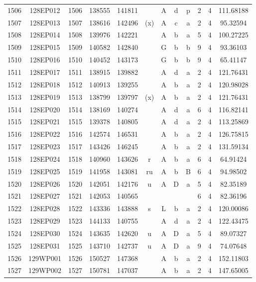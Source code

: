 \begin{tabular}{|*{12}{c|}}
1506 & 128EP012 & 1506 & 138555 & 141811 &  & A & d & p & 2 & 4 & 111.68188 \\ 
1507 & 128EP013 & 1507 & 138616 & 142496 & (x) & A & c & a & 2 & 4 & 95.32594 \\ 
1508 & 128EP014 & 1508 & 139976 & 142221 &  & A & b & a & 5 & 4 & 100.27225 \\ 
1509 & 128EP015 & 1509 & 140582 & 142840 &  & G & b & b & 9 & 4 & 93.36103 \\ 
1510 & 128EP016 & 1510 & 140452 & 143173 &  & G & b & b & 9 & 4 & 65.41147 \\ 
1511 & 128EP017 & 1511 & 138915 & 139882 &  & A & d & a & 2 & 4 & 121.76431 \\ 
1512 & 128EP018 & 1512 & 140913 & 139255 &  & A & b & a & 2 & 4 & 120.98028 \\ 
1513 & 128EP019 & 1513 & 138799 & 139797 & (x) & A & b & a & 2 & 4 & 121.76431 \\ 
1514 & 128EP020 & 1514 & 138169 & 140274 &  & A & d & a & 6 & 4 & 116.82141 \\ 
1515 & 128EP021 & 1515 & 139378 & 140805 &  & A & d & a & 2 & 4 & 113.25869 \\ 
1516 & 128EP022 & 1516 & 142574 & 146531 &  & A & b & a & 2 & 4 & 126.75815 \\ 
1517 & 128EP023 & 1517 & 143426 & 146245 &  & A & b & a & 2 & 4 & 131.59134 \\ 
1518 & 128EP024 & 1518 & 140960 & 143626 & r & A & b & a & 6 & 4 & 64.91424 \\ 
1519 & 128EP025 & 1519 & 141958 & 143081 & ru & A & b & B & 6 & 4 & 94.98502 \\ 
1520 & 128EP026 & 1520 & 142051 & 142176 & u & A & D & a & 5 & 4 & 82.35189 \\ 
1521 & 128EP027 & 1521 & 142053 & 140565 &  &  &  &  & 6 & 4 & 82.36196 \\ 
1522 & 128EP028 & 1522 & 143336 & 143888 & s & L & b & a & 2 & 4 & 120.00086 \\ 
1523 & 128EP029 & 1523 & 144133 & 140755 &  & A & d & a & 2 & 4 & 122.43475 \\ 
1524 & 128EP030 & 1524 & 143635 & 142620 & u & A & D & a & 5 & 4 & 89.07327 \\ 
1525 & 128EP031 & 1525 & 143710 & 142737 & u & A & D & a & 9 & 4 & 74.07648 \\ 
1526 & 129WP001 & 1526 & 150527 & 147368 &  & A & b & a & 2 & 4 & 152.11803 \\ 
1527 & 129WP002 & 1527 & 150781 & 147037 &  & A & b & a & 2 & 4 & 147.65005 \\ 

\end{tabular}
